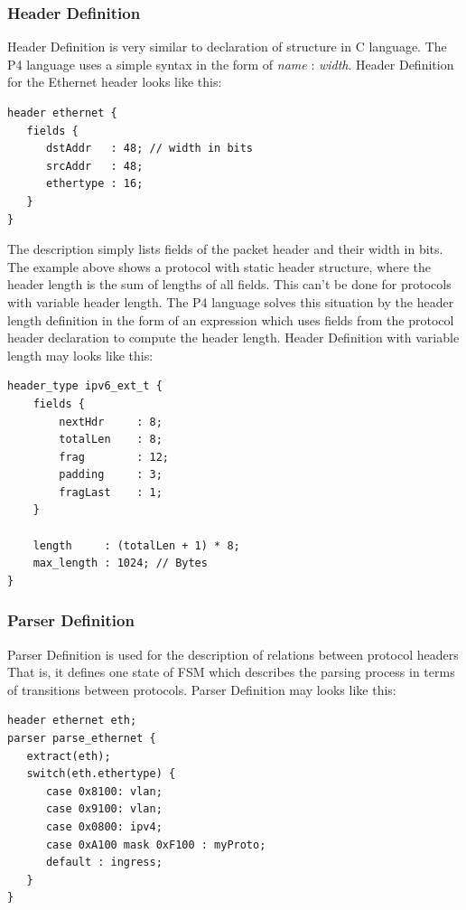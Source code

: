 \subsubsection*{Header Definition}

Header Definition is very similar to declaration of structure in C language. 
The P4 language uses a simple syntax in the form of \textit{name} : \textit{width}. 
Header Definition for the Ethernet header looks like this:

\begin{Verbatim}[fontsize=\small]
header ethernet {
   fields {
      dstAddr   : 48; // width in bits
      srcAddr   : 48;
      ethertype : 16;
   }
}
\end{Verbatim}

The description simply lists fields of the packet header and their width in bits. 
The example above shows a protocol with static header structure, where the header length is the sum of lengths of all fields. 
This can't be done for protocols with variable header length. 
The P4 language solves this situation by the header length definition in the form of an expression which uses fields from the protocol header 
declaration to compute the header length. Header Definition with variable length may looks like this:
\begin{Verbatim}[fontsize=\small]
header_type ipv6_ext_t {
    fields {
        nextHdr     : 8;
        totalLen    : 8;
        frag        : 12;
        padding     : 3;
        fragLast    : 1;
    }

    length     : (totalLen + 1) * 8;
    max_length : 1024; // Bytes
}
\end{Verbatim}

\subsubsection*{Parser Definition}
\label{sec:p4ParserDefinition}
Parser Definition is used for the description of relations between protocol headers
That is, it defines one state of FSM which describes the parsing process in terms of transitions between protocols. 
Parser Definition may looks like this:

\begin{Verbatim}[fontsize=\small]
header ethernet eth;
parser parse_ethernet {
   extract(eth);
   switch(eth.ethertype) {
      case 0x8100: vlan;
      case 0x9100: vlan;
      case 0x0800: ipv4;
      case 0xA100 mask 0xF100 : myProto;
      default : ingress;
   }
}
\end{Verbatim}

